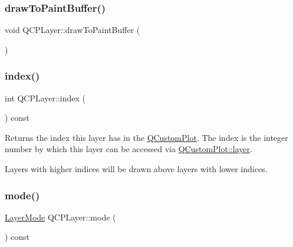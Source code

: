 \subsubsection{\texorpdfstring{drawToPaintBuffer()}{drawToPaintBuffer()}}
{\footnotesize\ttfamily void Q\+C\+P\+Layer\+::draw\+To\+Paint\+Buffer (\begin{DoxyParamCaption}{ }\end{DoxyParamCaption})\hspace{0.3cm}{\ttfamily [protected]}}

\mbox{\label{class_q_c_p_layer_ad322905c4700dcc7ceba63e011c730d2}} 
\subsubsection{\texorpdfstring{index()}{index()}}
{\footnotesize\ttfamily int Q\+C\+P\+Layer\+::index (\begin{DoxyParamCaption}{ }\end{DoxyParamCaption}) const\hspace{0.3cm}{\ttfamily [inline]}}

Returns the index this layer has in the \mbox{\hyperlink{class_q_custom_plot}{Q\+Custom\+Plot}}. The index is the integer number by which this layer can be accessed via \mbox{\hyperlink{class_q_custom_plot_a0a96244e7773b242ef23c32b7bdfb159}{Q\+Custom\+Plot\+::layer}}.

Layers with higher indices will be drawn above layers with lower indices. \mbox{\label{class_q_c_p_layer_a44ae50b011b19f3dd46a38d8e2e2c1b6}} 
\subsubsection{\texorpdfstring{mode()}{mode()}}
{\footnotesize\ttfamily \mbox{\hyperlink{class_q_c_p_layer_a67dcfc1590be2a1f2227c5a39bb59c7c}{Layer\+Mode}} Q\+C\+P\+Layer\+::mode (\begin{DoxyParamCaption}{ }\end{DoxyParamCaption}) const\hspace{0.3cm}{\ttfamily [inline]}}

\mbox{\label{class_q_c_p_layer_a37806f662b50b588fb1029a14fc5ef50}} 
